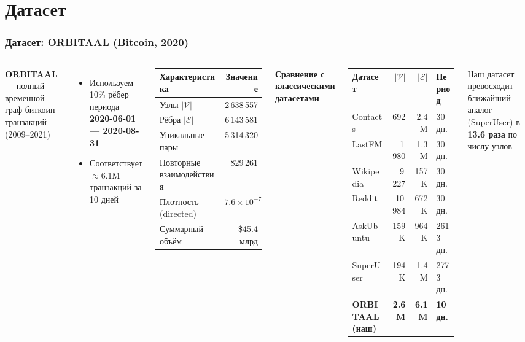 \documentclass[aspectratio=169]{beamer}
\begin{document}
\section{Датасет}
\begin{frame}
  \frametitle{Датасет: ORBITAAL (Bitcoin, 2020)}
  \begin{columns}
    \scriptsize
    \textbf{ORBITAAL} — полный временной граф биткоин-транзакций (2009–2021)
    \begin{itemize}
      \item Используем 10\% рёбер периода \textbf{2020-06-01 — 2020-08-31}
      \item Соответствует $\approx$6.1M транзакций за 10 дней
    \end{itemize}
    \vspace{0.2cm}
    \begin{table}
    \small
    \begin{tabular}{lr}
      \toprule
      Характеристика & Значение \\
      \midrule
      Узлы $|\mathcal{V}|$ & 2\,638\,557 \\
      Рёбра $|\mathcal{E}|$ & 6\,143\,581 \\
      Уникальные пары & 5\,314\,320 \\
      Повторные взаимодействия & 829\,261 \\
      Плотность (directed) & $7.6 \times 10^{-7}$ \\
      Суммарный объём & \$45.4 млрд \\
      \bottomrule
    \end{tabular}
    \end{table}
    \footnotesize
    \textbf{Сравнение с классическими датасетами}
    \begin{table}
    \tiny
    \begin{tabular}{lrrl}
      \toprule
      Датасет & $|\mathcal{V}|$ & $|\mathcal{E}|$ & Период \\
      \midrule
      Contacts & 692 & 2.4M & 30 дн. \\
      LastFM & 1\,980 & 1.3M & 30 дн. \\
      Wikipedia & 9\,227 & 157K & 30 дн. \\
      Reddit & 10\,984 & 672K & 30 дн. \\
      AskUbuntu & 159K & 964K & 2613 дн. \\
      SuperUser & 194K & 1.4M & 2773 дн. \\
      \midrule
      \textbf{ORBITAAL (наш)} & \textbf{2.6M} & \textbf{6.1M} & \textbf{10 дн.} \\
      \bottomrule
    \end{tabular}
    \end{table}
    \vspace{0.2cm}
    {\small Наш датасет превосходит ближайший аналог (SuperUser) в \textbf{13.6 раза} по числу узлов}
  \end{columns}
\end{frame}
\end{document}
